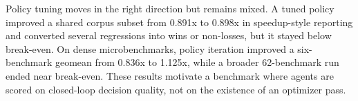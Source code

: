 Policy tuning moves in the right direction but remains mixed. A tuned policy improved a shared corpus subset from 0.891x to 0.898x in speedup-style reporting and converted several regressions into wins or non-losses, but it stayed below break-even. On dense microbenchmarks, policy iteration improved a six-benchmark geomean from 0.836x to 1.125x, while a broader 62-benchmark run ended near break-even. These results motivate a benchmark where agents are scored on closed-loop decision quality, not on the existence of an optimizer pass.
